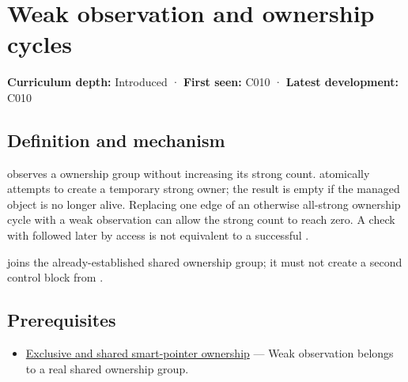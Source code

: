 \hypertarget{appendix-b9548675eb2b}{}\label{referencestart:appendix-b9548675eb2b}
\section{Weak observation and ownership cycles}\label{appendix-b9548675eb2b-weak-observation-and-ownership-cycles}

\hypertarget{appendix-b9548675eb2b-weak-observation-and-ownership-cycles}{}

\textbf{Curriculum depth:} Introduced · \textbf{First seen:} C010 · \textbf{Latest development:} C010

\begin{allmightroledefinition}

\subsection{Definition and mechanism}\label{appendix-b9548675eb2b-definition-and-mechanism}

\hypertarget{appendix-b9548675eb2b-definition-and-mechanism}{}

 observes a  ownership group without increasing its strong count.  atomically attempts to create a temporary strong owner; the result is empty if the managed object is no longer alive. Replacing one edge of an otherwise all-strong ownership cycle with a weak observation can allow the strong count to reach zero. A check with  followed later by access is not equivalent to a successful .

\end{allmightroledefinition}

 joins the already-established shared ownership group; it must not create a second  control block from .

\subsection{Prerequisites}\label{appendix-b9548675eb2b-prerequisites}

\hypertarget{appendix-b9548675eb2b-prerequisites}{}

\begin{itemize}
\tightlist
\item
  \hyperref[appendix-51602cabe815]{Exclusive and shared smart-pointer ownership} --- Weak observation belongs to a real shared ownership group.
\end{itemize}

